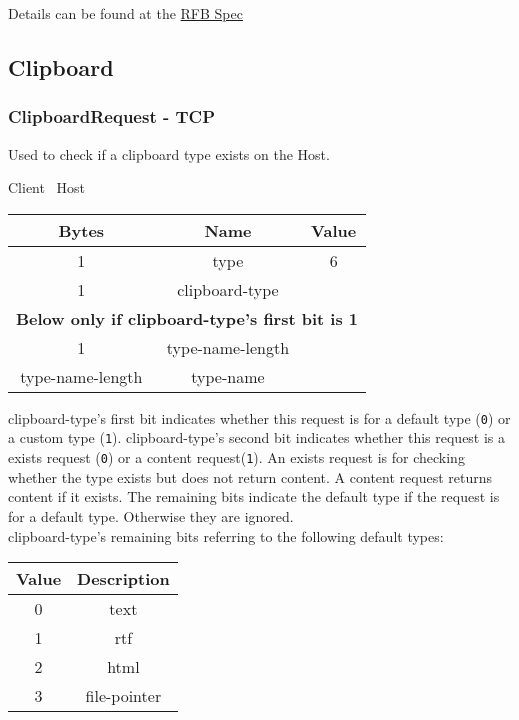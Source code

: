 Details can be found at the \href{https://github.com/rfbproto/rfbproto/blob/master/rfbproto.rst#keyevent}{RFB Spec}

\subsection{Clipboard}

\subsubsection{ClipboardRequest - TCP}

Used to check if a clipboard type exists on the Host.

\begin{center}
    Client \textrightarrow\ Host\\
    \begin{tabular}{|c|c|c|}
        \hline
        \textbf{Bytes}   & \textbf{Name}    & \textbf{Value} \\
        \hline
        1                & type             & 6              \\
        \hline
        1                & clipboard-type   &                \\
        \hline
        \multicolumn{3}{|c|}{\textbf{Below only if clipboard-type's first bit is 1} } \\
        \hline
        1                & type-name-length &                \\
        \hline
        type-name-length & type-name        &                \\
        \hline
    \end{tabular}
\end{center}

clipboard-type's first bit indicates whether this request is for a default type (\texttt{0}) or a custom type
(\texttt{1}). clipboard-type's second bit indicates whether this request is a exists request (\texttt{0}) or a
content request(\texttt{1}). An exists request is for checking whether the type exists but does not return content. A
content request returns content if it exists. The remaining bits indicate the default type if the request is for a
default type. Otherwise they are ignored.\\

clipboard-type's remaining bits referring to the following default types:

\begin{center}
    \begin{tabular}{|c|c|}
        \hline
        \textbf{Value} & \textbf{Description} \\
        \hline
        0              & text                 \\
        \hline
        1              & rtf                  \\
        \hline
        2              & html                 \\
        \hline
        3              & file-pointer         \\
        \hline
    \end{tabular}
\end{center}

